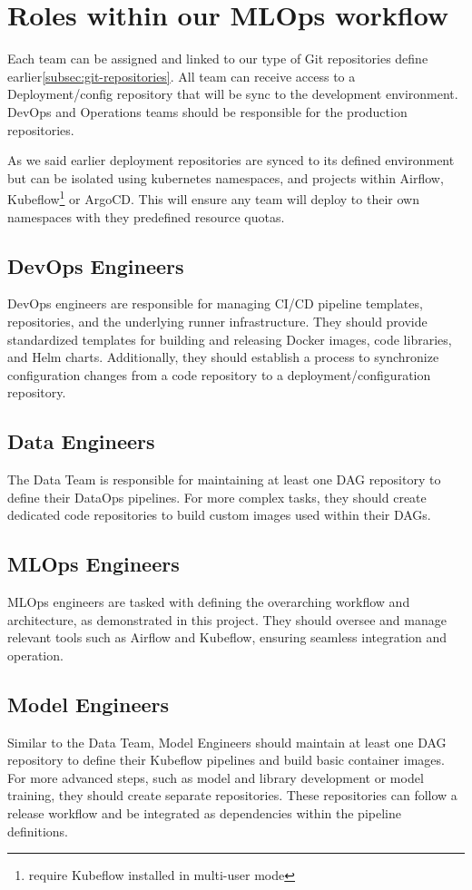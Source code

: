 \section{Roles within our MLOps workflow}

Each team can be assigned and linked to our type of Git repositories define earlier\ref{subsec:git-repositories}.
All team can receive access to a Deployment/config repository that will be sync to the development environment.
DevOps and Operations teams should be responsible for the production repositories.

As we said earlier deployment repositories are synced to its defined environment but can be isolated using kubernetes namespaces,
and projects within Airflow, Kubeflow\footnote{require Kubeflow installed in multi-user mode} or ArgoCD.
This will ensure any team will deploy to their own namespaces with they predefined resource quotas.

\subsection{DevOps Engineers}
DevOps engineers are responsible for managing CI/CD pipeline templates, repositories, and the underlying runner infrastructure.
They should provide standardized templates for building and releasing Docker images, code libraries, and Helm charts.
Additionally, they should establish a process to synchronize configuration changes from a code repository to a deployment/configuration repository.
\subsection{Data Engineers}
The Data Team is responsible for maintaining at least one DAG repository to define their DataOps pipelines.
For more complex tasks, they should create dedicated code repositories to build custom images used within their DAGs.
\subsection{MLOps Engineers}
MLOps engineers are tasked with defining the overarching workflow and architecture, as demonstrated in this project.
They should oversee and manage relevant tools such as Airflow and Kubeflow, ensuring seamless integration and operation.
\subsection{Model Engineers}
Similar to the Data Team, Model Engineers should maintain at least one DAG repository to define their Kubeflow pipelines and build basic container images.
For more advanced steps, such as model and library development or model training, they should create separate repositories.
These repositories can follow a release workflow and be integrated as dependencies within the pipeline definitions.
